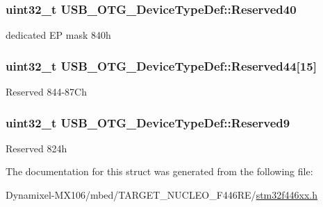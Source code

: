 \subsubsection[{\texorpdfstring{Reserved40}{Reserved40}}]{\setlength{\rightskip}{0pt plus 5cm}uint32\+\_\+t U\+S\+B\+\_\+\+O\+T\+G\+\_\+\+Device\+Type\+Def\+::\+Reserved40}\hypertarget{struct_u_s_b___o_t_g___device_type_def_a4356045c881b1f037c3016473e580679}{}\label{struct_u_s_b___o_t_g___device_type_def_a4356045c881b1f037c3016473e580679}
dedicated EP mask 840h 
\subsubsection[{\texorpdfstring{Reserved44}{Reserved44}}]{\setlength{\rightskip}{0pt plus 5cm}uint32\+\_\+t U\+S\+B\+\_\+\+O\+T\+G\+\_\+\+Device\+Type\+Def\+::\+Reserved44\mbox{[}15\mbox{]}}\hypertarget{struct_u_s_b___o_t_g___device_type_def_a6bb6a88a8d92f9cb65d104f40934844b}{}\label{struct_u_s_b___o_t_g___device_type_def_a6bb6a88a8d92f9cb65d104f40934844b}
Reserved 844-\/87\+Ch 
\subsubsection[{\texorpdfstring{Reserved9}{Reserved9}}]{\setlength{\rightskip}{0pt plus 5cm}uint32\+\_\+t U\+S\+B\+\_\+\+O\+T\+G\+\_\+\+Device\+Type\+Def\+::\+Reserved9}\hypertarget{struct_u_s_b___o_t_g___device_type_def_a7d7b3f7c72c92856e77d149c43200709}{}\label{struct_u_s_b___o_t_g___device_type_def_a7d7b3f7c72c92856e77d149c43200709}
Reserved 824h 

The documentation for this struct was generated from the following file\+:\begin{DoxyCompactItemize}
\item 
Dynamixel-\/\+M\+X106/mbed/\+T\+A\+R\+G\+E\+T\+\_\+\+N\+U\+C\+L\+E\+O\+\_\+\+F446\+R\+E/\hyperlink{stm32f446xx_8h}{stm32f446xx.\+h}\end{DoxyCompactItemize}
